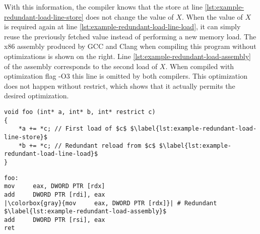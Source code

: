 With this information, the compiler knows that the store at line \ref{lst:example-redundant-load-line-store} does not change the value of $X$.
When the value of $X$ is required again at line \ref{lst:example-redundant-load-line-load},
it can simply reuse the previously fetched value instead of performing a new memory load.
The x86 assembly produced by GCC and Clang when compiling this program without optimizations is shown on the right.
Line \ref{lst:example-redundant-load-assembly} of the assembly corresponds to the second load of $X$.
When compiled with optimization flag -O3 this line is omitted by both compilers.
This optimization does not happen without restrict, which shows that it actually permits the desired optimization.

\begin{figure*}[!h]
\centering
\begin{minipage}[t]{0.53\linewidth}
\centering
\begin{code}
\begin{verbatim}
void foo (int* a, int* b, int* restrict c)
{
    *a += *c; // First load of $c$ $\label{lst:example-redundant-load-line-store}$
    *b += *c; // Redundant reload from $c$ $\label{lst:example-redundant-load-line-load}$
}
\end{verbatim}
\end{code}
\end{minipage}%
\begin{minipage}[t]{0.47\linewidth}
\centering
\begin{code}
\centering
\begin{verbatim}
foo:
mov     eax, DWORD PTR [rdx]
add     DWORD PTR [rdi], eax
|\colorbox{gray}{mov     eax, DWORD PTR [rdx]}| # Redundant $\label{lst:example-redundant-load-assembly}$
add     DWORD PTR [rsi], eax
ret
\end{verbatim}
\end{code}
\end{minipage}
\label{lst:example-redundant-load}
\end{figure*}

